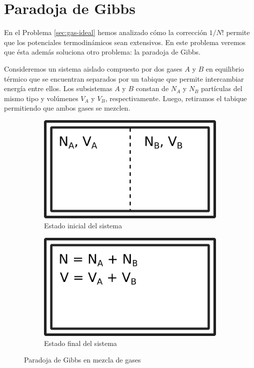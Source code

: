 \documentclass[a4paper,11pt]{article}
\begin{document}
\section{Paradoja de Gibbs}

En el Problema \ref{sec:gas-ideal} hemos analizado cómo la corrección $1/N!$
permite que los potenciales termodinámicos sean extensivos. En este problema
veremos que ésta además soluciona otro problema: la paradoja de Gibbs.

Consideremos un sistema aislado compuesto por dos gases $A$ y $B$ en
equilibrio térmico que se encuentran separados por un tabique que
permite intercambiar energía entre ellos.
Los subsistemas $A$ y $B$ constan de $N_A$ y $N_B$ partículas del mismo
tipo y volúmenes $V_A$ y $V_B$, respectivamente.
Luego, retiramos el tabique permitiendo que ambos gases se mezclen.

\begin{figure}[h!]
    \centering
    \begin{subfigure}[b]{0.3\textwidth}
        \includegraphics[width=\textwidth]{figs/paradoja-gibbs-1.png}
        \caption{Estado inicial del sistema}
        \label{fig:gibbs-tabique}
    \end{subfigure}
    \hspace{0.1\textwidth}
    \begin{subfigure}[b]{0.3\textwidth}
        \includegraphics[width=\textwidth]{figs/paradoja-gibbs-2.png}
        \caption{Estado final del sistema}
        \label{fig:gibbs-mezcla}
    \end{subfigure}
    \caption{Paradoja de Gibbs en mezcla de gases}
\end{figure}
\end{document}
